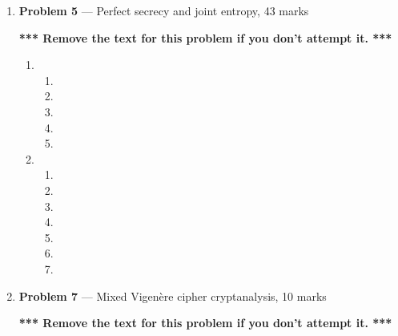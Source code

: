 \documentclass[11pt]{article}
\theoremstyle{definition}
\begin{document}
\begin{enumerate}
\item[] \textbf{Problem 5} --- Perfect secrecy and joint entropy, 43 marks

\textbf{*** Remove the text for this problem if you don't attempt it. ***}

\begin{enumerate}

\item
\begin{enumerate}

\item

\item

\item

\item

\item
\end{enumerate}

\item
\begin{enumerate}
\item

\item

\item

\item

\item

\item

\item
\end{enumerate}
\end{enumerate}

\newpage

\item[] \textbf{Problem 7} --- Mixed Vigen\`ere cipher cryptanalysis, 10 marks

\textbf{*** Remove the text for this problem if you don't attempt it. ***}


\end{enumerate}
\end{document}
